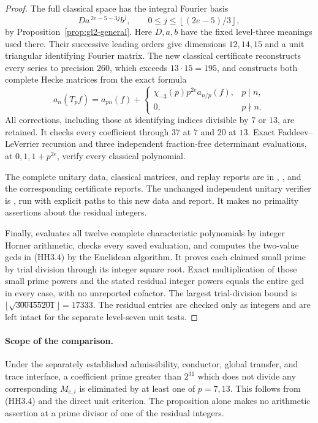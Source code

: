 \documentclass[11pt,a4paper]{article}
\theoremstyle{definition}
\begin{document}
\begin{proof}
The full classical space has the integral Fourier basis
\[
 Da^{\,2e-5-3j}b^j,\qquad
 0\le j\le\left\lfloor(2e-5)/3\right\rfloor ,
 \tag{HH3.7}
\]
by Proposition~\ref{prop:gl2-general}. Here \(D,a,b\) have
the fixed level-three meanings used there. Their successive
leading orders give dimensions \(12,14,15\) and a unit
triangular identifying Fourier matrix. The new classical
certificate reconstructs every series to precision \(260\),
which exceeds \(13\cdot15=195\), and constructs both complete
Hecke matrices from the exact formula
\[
 a_n(T_pf)=a_{pn}(f)+
 \begin{cases}
   \chi_{-3}(p)p^{2e}a_{n/p}(f),&p\mid n,\\
   0,&p\nmid n.
 \end{cases}
 \tag{HH3.8}
\]
All corrections, including those at identifying indices
divisible by \(7\) or \(13\), are retained.
It checks every coefficient through \(37\) at \(7\) and
\(20\) at \(13\). Exact Faddeev--LeVerrier recursion and
three independent fraction-free determinant evaluations,
at \(0,1,1+p^{2e}\), verify every classical polynomial.

The complete unitary data, classical matrices, and replay
reports are in
,
,
and the corresponding certificate reports.
The unchanged independent unitary verifier is
, run
with explicit paths to this new data and report.
It makes no primality assertions about the residual integers.

Finally,
evaluates all twelve complete characteristic polynomials
by integer Horner arithmetic, checks every saved evaluation,
and computes the two-value gcds in (HH3.4) by the Euclidean
algorithm. It proves each claimed small prime by trial division
through its integer square root. Exact multiplication of those
small prime powers and the stated residual integer powers
equals the entire gcd in every case, with no unreported
cofactor. The largest trial-division bound is
\(\lfloor\sqrt{300455201}\rfloor=17333\).
The residual entries are checked only as integers and are
left intact for the separate level-seven unit tests.
\end{proof}

\paragraph{Scope of the comparison.}
Under the separately established admissibility, conductor,
global transfer, and trace interface, a coefficient prime
greater than \(2^{31}\) which does not divide any corresponding
\(M_{e,i}\) is eliminated by at least one of \(p=7,13\).
This follows from (HH3.4) and the direct unit criterion.
The proposition alone makes no arithmetic assertion at
a prime divisor of one of the residual integers.
\end{document}
